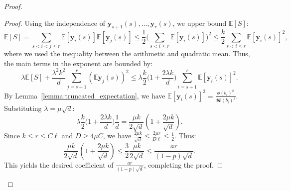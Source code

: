\documentclass[11pt]{amsart}
\theoremstyle{definition}
\def\bE{\mathbb{E}}
\def\by{\boldsymbol{y}}
\begin{document}
\begin{proof}
\begin{proof}
Using the independence of $\by_{s+1}(s), \dots, \by_r(s)$, we upper bound $\bE[S]$:
{\smaller[0.3]
\[\bE[S]=\sum_{s<i<j\leq r}\bE[\by_i(s)]\bE[\by_j(s)]\leq \frac{1}{2}\Big(\sum_{s<i\leq r}\bE[\by_i(s)]\Big)^2\leq \frac{k}{2}\sum_{s<i\leq r}\bE[\by_i(s)]^2,\]
}
where we used the inequality between the arithmetic and quadratic mean. Thus, the main terms in the exponent are bounded by:
{\smaller[0.3]
\[\lambda \bE[S] \!+\! \frac{\lambda^2k^2}{d}\sum_{j=s+1}^r (\bE \by_j(s))^2\leq \lambda \frac{k}{2}\Big(1\!+\!\frac{2\lambda k}{d}\Big)\sum_{i=s+1}^r \bE[\by_i(s)]^2.\]
}
By Lemma~\ref{lemma:truncated_expectation}, we have $\bE[\by_i(s)]^2 = \frac{\phi(b_i)^2}{d\Phi(b_i)^2}$. Substituting $\lambda = \mu\sqrt{d}$:
{\smaller[0.3]
\[ \lambda \frac{k}{2}\Big(1\!+\!\frac{2\lambda k}{d}\Big) \frac{1}{d} = \frac{\mu k}{2\sqrt{d}} \left( 1 + \frac{2\mu k}{\sqrt{d}} \right). \]
}
Since $k \le r\le C\ell$ and $D \ge 4\mu C$, we have $\frac{2\mu k}{\sqrt{d}} \le \frac{2\mu r}{D\ell}\leq \frac{1}{2}$. Thus:
{\smaller[0.3]
\[ \frac{\mu k}{2\sqrt{d}} \left( 1 + \frac{2\mu k}{\sqrt{d}} \right)\leq \frac{3}{2}\frac{\mu k}{2\sqrt{d}}\leq \frac{ar}{(1-p)\sqrt{d}}. \]
}
This yields the desired coefficient of $\frac{ar}{(1-p)\sqrt d}$, completing the proof.
\end{proof}


\end{proof}
\end{document}
